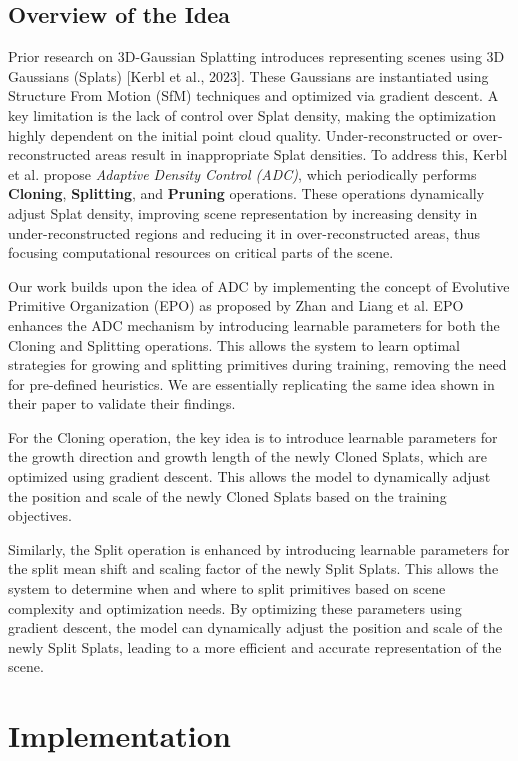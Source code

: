 \documentclass[11pt]{report}
\begin{document}
\section{Overview of the Idea}

Prior research on 3D-Gaussian Splatting introduces representing scenes using 3D Gaussians (Splats) [Kerbl et al., 2023]. These Gaussians are instantiated using Structure From Motion (SfM) techniques and optimized via gradient descent. A key limitation is the lack of control over Splat density, making the optimization highly dependent on the initial point cloud quality. Under-reconstructed or over-reconstructed areas result in inappropriate Splat densities. To address this, Kerbl et al. propose \emph{Adaptive Density Control (ADC)}, which periodically performs \textbf{Cloning}, \textbf{Splitting}, and \textbf{Pruning} operations. These operations dynamically adjust Splat density, improving scene representation by increasing density in under-reconstructed regions and reducing it in over-reconstructed areas, thus focusing computational resources on critical parts of the scene.

Our work builds upon the idea of ADC by implementing the concept of Evolutive Primitive Organization (EPO) as proposed by Zhan and Liang et al. EPO enhances the ADC mechanism by introducing learnable parameters for both the Cloning and Splitting operations. This allows the system to learn optimal strategies for growing and splitting primitives during training, removing the need for pre-defined heuristics. We are essentially replicating the same idea shown in their paper to validate their findings.

For the Cloning operation, the key idea is to introduce learnable parameters for the growth direction and growth length of the newly Cloned Splats, which are optimized using gradient descent. This allows the model to dynamically adjust the position and scale of the newly Cloned Splats based on the training objectives.

Similarly, the Split operation is enhanced by introducing learnable parameters for the split mean shift and scaling factor of the newly Split Splats. This allows the system to determine when and where to split primitives based on scene complexity and optimization needs. By optimizing these parameters using gradient descent, the model can dynamically adjust the position and scale of the newly Split Splats, leading to a more efficient and accurate representation of the scene.

\chapter{Implementation}
\end{document}
